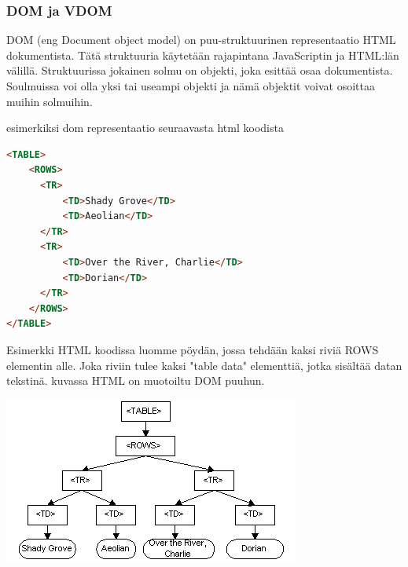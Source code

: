 \medskip



\subsubsection{DOM ja VDOM}




DOM (eng Document object model) on puu-struktuurinen representaatio HTML dokumentista.
Tätä struktuuria käytetään rajapintana JavaScriptin ja HTML:län välillä. 
Struktuurissa jokainen solmu on objekti, joka esittää osaa dokumentista. 
Soulmuissa voi olla yksi tai useampi objekti ja nämä objektit voivat osoittaa muihin solmuihin.



esimerkiksi dom representaatio seuraavasta html koodista

    
\begin{tcolorbox}
\begin{lstlisting}[language=html]
<TABLE>
    <ROWS> 
      <TR> 
          <TD>Shady Grove</TD>
          <TD>Aeolian</TD> 
      </TR> 
      <TR>
          <TD>Over the River, Charlie</TD>
          <TD>Dorian</TD> 
      </TR> 
    </ROWS>
</TABLE>
\end{lstlisting}
\end{tcolorbox}


Esimerkki HTML koodissa luomme pöydän, jossa tehdään kaksi riviä ROWS elementin alle. 
Joka riviin tulee kaksi "table data"{} elementtiä, jotka sisältää datan tekstinä.
kuvassa \nextImageCount {} HTML on muotoiltu DOM puuhun.
\bigskip



\includegraphics{./src/public/oppar/dom.png}

